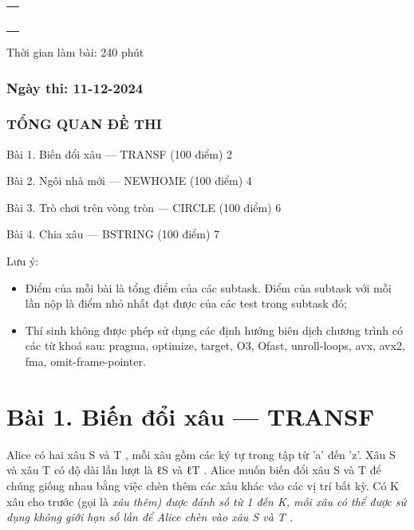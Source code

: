 {}

\begin{longtable}[]{@{}l@{}}
\toprule\noalign{}
\endhead
\bottomrule\noalign{}
\endlastfoot
 \\
 \\
 \\
 \\
 \\
\end{longtable}

\hfill\break

Thời gian làm bài: 240 phút

\subsubsection{Ngày thi: 11-12-2024}\label{nguxe0y-thi-11-12-2024}

\hfill\break

\subsubsection{TỔNG QUAN ĐỀ THI}\label{tux1ed5ng-quan-ux111ux1ec1-thi}

Bài 1. Biến đổi xâu --- TRANSF (100 điểm){ }2

Bài 2. Ngôi nhà mới --- NEWHOME (100 điểm){ }4

Bài 3. Trò chơi trên vòng tròn --- CIRCLE (100 điểm){ }6

Bài 4. Chia xâu --- BSTRING (100 điểm){ }7

Lưu ý:

\begin{itemize}
\item
  Điểm của mỗi bài là tổng điểm của các subtask. Điểm của subtask với
  mỗi lần nộp là điểm nhỏ nhất đạt được của các test trong subtask đó;
\item
  Thí sinh không được phép sử dụng các định hướng biên dịch chương trình
  có các từ khoá sau: {pragma, optimize, target, O3, Ofast,
  unroll-loops, avx, avx2, fma, omit-frame-pointer}.
\end{itemize}

\section{Bài 1. Biến đổi xâu ---
TRANSF}\label{buxe0i-1.-biux1ebfn-ux111ux1ed5i-xuxe2u-transf}

\hfill\break

Alice có hai xâu {S }và {T }, mỗi xâu gồm các ký tự trong tập từ 'a' đến
'z'. Xâu {S }và xâu {T }có độ dài lần lượt là {ℓ}{S}{ }và {ℓ}{T}{ }.
Alice muốn biến đổi xâu {S }và {T }để chúng giống nhau bằng việc chèn
thêm các xâu khác vào các vị trí bất kỳ. Có {K }xâu cho trước (gọi là
\it{xâu thêm}) được đánh số từ {1 }đến {K}, mỗi xâu có thể được sử
dụng không giới hạn số lần để Alice chèn vào xâu {S }và {T }.

